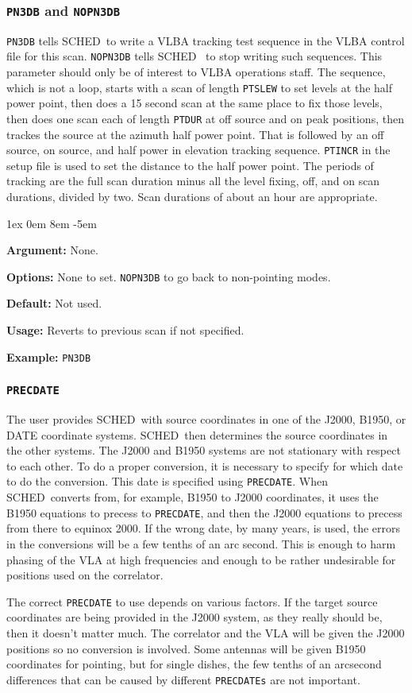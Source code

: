 \documentclass{report}
\newcommand{\schedb}{{\sc SCHED~}}
\newcommand{\rcwbox}[5]{
  \begin{list}{}{\parsep 1ex  \itemsep 0em
                 \leftmargin 8em  \itemindent -5em }
    \item {\bf Argument:} #1
    \item {\bf Options:}  #2
    \item {\bf Default:}  #3
    \item {\bf Usage:}    #4
    \item {\bf Example:}  #5
  \end{list}
}
\begin{document}
\subsubsection{\label{MP:PN3DB}{\tt PN3DB} and {\tt NOPN3DB}}

{\tt PN3DB} tells \schedb to write a VLBA tracking test sequence in
the VLBA control file for this scan. {\tt NOPN3DB} tells \schedb
to stop writing such sequences.  This parameter should only be of
interest to VLBA operations staff.  The sequence, which is not a
loop, starts with a scan of length {\tt PTSLEW} to set levels at
the half power point, then does a 15 second scan at the same place
to fix those levels, then does one scan each of length {\tt PTDUR}
at off source and on peak positions, then trackes the source at
the azimuth half power point.  That is followed by an off source,
on source, and half power in elevation tracking sequence.  {\tt PTINCR}
in the setup file is used to set the distance to the half power point.
The periods of tracking are the full scan duration minus all the
level fixing, off, and on scan durations, divided by two.  Scan
durations of about an hour are appropriate.


\rcwbox
{None.}
{None to set. {\tt NOPN3DB} to go back to non-pointing modes.}
{Not used.}
{Reverts to previous scan if not specified.}
{{\tt PN3DB}}


\subsubsection{\label{MP:PRECDATE}{\tt PRECDATE}}

The user provides \schedb with source coordinates in one of the J2000,
B1950, or DATE coordinate systems.  \schedb then determines the source
coordinates in the other systems.  The J2000 and B1950 systems are not
stationary with respect to each other.  To do a proper conversion, it
is necessary to specify for which date to do the conversion.  This
date is specified using {\tt PRECDATE}.  When \schedb converts from,
for example, B1950 to J2000 coordinates, it uses the B1950 equations
to precess to {\tt PRECDATE}, and then the J2000 equations to precess
from there to equinox 2000.  If the wrong date, by many years, is used,
the errors in the conversions will be a few tenths of an arc second.
This is enough to harm phasing of the VLA at high frequencies and
enough to be rather undesirable for positions used on the correlator.

The correct {\tt PRECDATE} to use depends on various factors.  If the
target source coordinates are being provided in the J2000 system, as
they really should be, then it doesn't matter much.  The correlator
and the VLA will be given the J2000 positions so no conversion is
involved.  Some antennas will be given B1950 coordinates for pointing,
but for single dishes, the few tenths of an arcsecond differences that
can be caused by different {\tt PRECDATEs} are not important.
\end{document}
